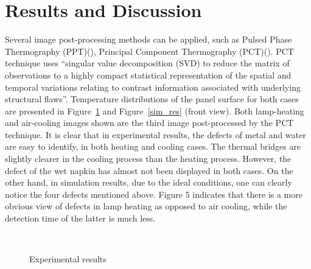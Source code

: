 \section{Results and Discussion}
Several image post-processing methods can be applied, such as Pulsed Phase Thermography (PPT)(\citet{Maldague1996}), Principal Component Thermography (PCT)(\citet{Rajic2002}). PCT technique uses “singular value decomposition (SVD) to reduce the matrix of observations to a highly compact statistical representation of the spatial and temporal variations relating to contrast information associated with underlying structural flaws”. Temperature distributions of the panel surface for both cases are presented in Figure~\ref{exp_res} and Figure~\ref{sim_res} (front view). Both lamp-heating and air-cooling images shown are the third image post-processed by the PCT technique. It is clear that in experimental results, the defects of metal and water are easy to identify, in both heating and cooling cases. The thermal bridges are slightly clearer in the cooling process than the heating process. However, the defect of the wet napkin has almost not been displayed in both cases. On the other hand, in simulation results, due to the ideal conditions, one can clearly notice the four defects mentioned above. Figure 5 indicates that there is a more obvious view of defects in lamp heating as opposed to air cooling, while the detection time of the latter is much less.
\begin{figure}
    \hspace{-20pt}
    \hspace{-10pt}
    \\

    \hspace{-20pt}
    \hspace{-10pt}
    \caption{Experimental results}
    \label{exp_res}
\end{figure}

